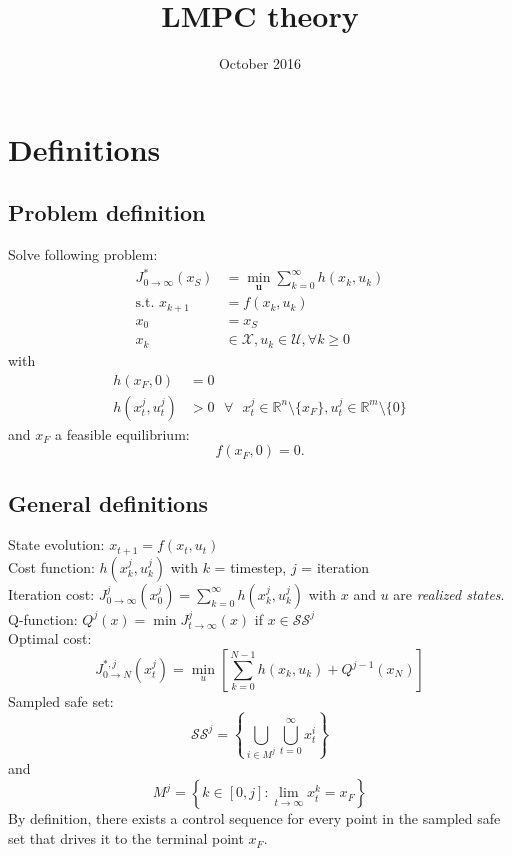 \documentclass{article}
\title{LMPC theory}
\author{}
\date{October 2016}
\begin{document}

\section{Definitions}
\subsection{Problem definition}
Solve following problem:
\begin{align}
J_{0\rightarrow\infty}^*(x_S)&=\min_{\mathbf{u}}\sum_{k=0}^\infty h(x_k,u_k)\\
\text{s.t. } x_{k+1}&=f(x_k,u_k)\\
x_0&=x_S\\
x_k&\in\mathcal{X},u_k\in\mathcal{U},\forall k\geq 0
\end{align}
with 
\begin{align}
h(x_F,0)&=0\\
h(x_t^j,u_t^j)&>0\text{ } \forall \text{ } x_t^j \in \mathbb{R}^n \setminus \{x_F\},u_t^j\in\mathbb{R}^m\setminus \{0\}
\end{align}
and $x_F$ a feasible equilibrium:
\[
f(x_F,0)=0.
\]

\subsection{General definitions}
State evolution: $x_{t+1}=f(x_t,u_t)$\\
Cost function: $h(x_k^j,u_k^j)$ with $k$ = timestep, $j$ = iteration\\
Iteration cost: $J_{0\rightarrow\infty}^j(x_0^j) = \sum_{k=0}^{\infty} h(x_k^j,u_k^j)$ with $x$ and $u$ are \emph{realized states}.\\
Q-function: $Q^j(x) = \min J_{t\rightarrow\infty}^j(x)$ if $x \in \mathcal{SS}^j$\\
Optimal cost:
\[
J_{0\rightarrow N}^{*,j}(x_t^j) = \min_u \left[\sum_{k=0}^{N-1}h(x_k,u_k)+Q^{j-1}(x_N)\right]
\]
Sampled safe set:
\[
\mathcal{SS}^j = \left\{ \bigcup_{i\in M^j} \bigcup_{t=0}^\infty x_t^i\right\}
\]
and
\[
M^j=\left\{ k\in [0,j]: \lim_{t\rightarrow\infty}x_t^k=x_F\right\}
\]
By definition, there exists a control sequence for every point in the sampled safe set that drives it to the terminal point $x_F$.
\end{document}
